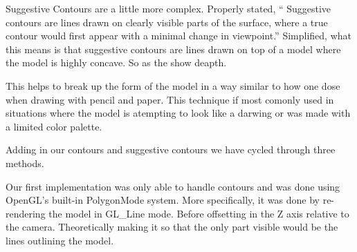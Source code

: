 \begin{figure}[h]
\begin{subfigure}[b]{0.3\textwidth}
    \caption{}
    \label{fig-5}
\end{subfigure}
\end{figure}

Suggestive Contours are a little more complex. Properly stated, “ Suggestive contours are lines drawn 
on clearly visible parts of the surface, where a true contour would first appear with a minimal change 
in viewpoint.”  \cite{Contours} Simplified, what this means is that suggestive contours are lines drawn 
on top of a model where the model is highly concave. So as the show deapth.

This helps to break up the form of the model in a way similar to how one dose when drawing with pencil 
and paper. This technique if most comonly used in situations where the model is atempting to look like 
a darwing or was made with a limited color palette.

Adding in our contours and suggestive contours we have cycled through three methods.

Our first implementation was only able to handle contours and was done using OpenGL's built-in PolygonMode 
system. More specifically, it was done by re-rendering the model in GL\_Line mode. Before offsetting in the 
Z axis relative to the camera. Theoretically making it so that the only part visible would be the lines 
outlining the model.

